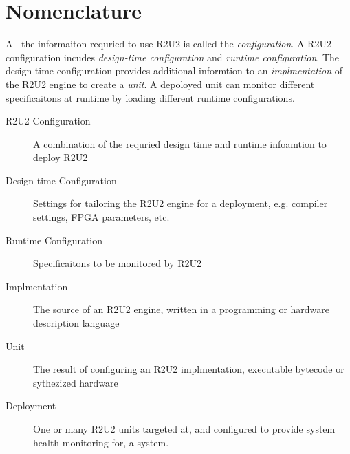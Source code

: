 \section{Nomenclature}
All the informaiton requried to use R2U2 is called the \emph{configuration}.
A R2U2 configuration incudes \emph{design-time configuration} and \emph{runtime configuration}.
The design time configuration provides additional informtion to an \emph{implmentation} of the R2U2 engine to create a \emph{unit}.
A depoloyed unit can monitor different specificaitons at runtime by loading different runtime configurations.

\begin{description}
    \item[R2U2 Configuration]{A combination of the requried design time and runtime infoamtion to deploy R2U2}
    \item[Design-time Configuration]{Settings for tailoring the R2U2 engine for a deployment, e.g. compiler settings, FPGA parameters, etc.}
    \item[Runtime Configuration]{Specificaitons to be monitored by R2U2}
    \item[Implmentation]{The source of an R2U2 engine, written in a programming or hardware description language}
    \item[Unit]{The result of configuring an R2U2 implmentation, executable bytecode or sythezized hardware}
    \item[Deployment]{One or many R2U2 units targeted at, and configured to provide system health monitoring for, a system.}
\end{description}